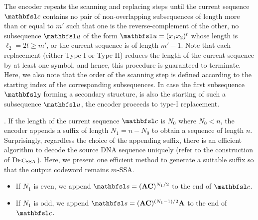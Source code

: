 \documentclass[conference]{IEEEtran}
\theoremstyle{plain}
\theoremstyle{definition}
\newcommand{\bu}{{\mathbfsl u}}
\newcommand{\bs}{{\mathbfsl s}}
\newcommand{\by}{{\mathbfsl y}}
\newcommand{\bc}{{\mathbfsl c}}
\renewcommand{\ge}{\geqslant}
\newcommand{\dec}{\textsc{Dec}}
\begin{document}
\noindent The encoder repeats the scanning and replacing steps until the current sequence $\bc$ contains no pair of non-overlapping subsequences of length more than or equal to $m'$ such that one is the reverse-complement of the other, no subsequence $\bu$ of the form $\bu=(x_1x_2)^t$ whose length is $\ell_2=2t \ge m'$, or the current sequence is of length $m'-1$. Note that each replacement (either Type-I or Type-II) reduces the length of the current sequence by at least one symbol, and hence, this procedure is guaranteed to terminate. Here, we also note that the order of the scanning step is defined according to the starting index of the corresponding subsequences. In case the first subsequence $\by$ forming a secondary structure, is also the starting of such a subsequence $\bu$, the encoder proceeds to type-I replacement.  
\vspace{0.05in} 

. If the length of the current sequence $\bc$ is $N_0$ where $N_0<n$, the encoder appends a suffix of length $N_1=n-N_0$ to obtain a sequence of length $n$. Surprisingly, regardless the choice of the appending suffix, there is an efficient algorithm to decode the source DNA sequence uniquely (refer to the construction of $\dec_{{\rm SSA}}$). Here, we present one efficient method to generate a suitable suffix so that the output codeword remains $m$-SSA.  %
\begin{itemize}
\item If $N_1$ is even, we append $\bs=({\bf A}{\bf C})^{N_1/2}$ to the end of $\bc$. 
\item If $N_1$ is odd, we append $\bs=({\bf A}{\bf C})^{(N_1-1)/2}{\bf A}$ to the end of $\bc$.
\end{itemize}
\end{document}
